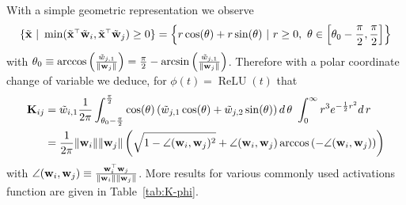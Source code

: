 \documentclass[11pt]{article}
\DeclareMathOperator{\ReLU}{ReLU}
\begin{document}
With a simple geometric representation we observe 
\[
  \{ \tilde \x~|~\min(\tilde \x^\top \tilde \w_i, \tilde \x^\top \tilde \w_j) \ge 0 \} = \left\{ r \cos(\theta) + r \sin (\theta)~|~r\ge0,~\theta \in \left[ \theta_0 - \frac{\pi}2, \frac{\pi}2 \right] \right\}
\]
with $\theta_0 \equiv \arccos \left( \frac{ \tilde w_{j,1} }{ \|\mathbf w_j\| } \right) = \frac{\pi}2 - \arcsin \left( \frac{ \tilde w_{j,1} }{ \|\mathbf w_j\| } \right)$. Therefore with a polar coordinate change of variable we deduce, for $\phi(t) = \ReLU(t)$ that
\begin{align*}
  \mathbf K_{ij} &= \tilde w_{i,1} \frac1{2\pi} \int_{\theta_0 - \frac{\pi}2}^{\frac{\pi}2} \cos(\theta) \left( \tilde w_{j,1} \cos(\theta) + \tilde w_{j,2} \sin(\theta) \right) d\,\theta \ \int_0^\infty r^3 e^{-\frac12 r^2} d\,r \\
  &=\frac1{2\pi} \|\mathbf w_i\| \|\mathbf w_j\| \left( \sqrt{ 1-\angle(\mathbf w_i,\mathbf w_j)^2 } + \angle(\mathbf w_i,\mathbf w_j) \arccos\left( - \angle(\mathbf w_i,\mathbf w_j) \right) \right)
\end{align*}
with $\angle(\w_i,\w_j) \equiv \frac{\w_i^\top \w_j}{ \|\w_i\| \|\w_j\| }$. More results for various commonly used activations function are given in Table~\ref{tab:K-phi}.
\end{document}
